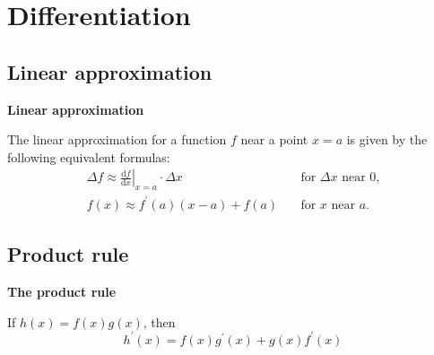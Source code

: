 \chapter{Differentiation}
\section{Linear approximation}
\textbf{Linear approximation}

The linear approximation for a function $f$ near a point $x=a$ is given by the following equivalent formulas:
\begin{align*}
    \Delta f\approx\left.\frac{\mathrm{d}f}{\mathrm{d}x}\right|_{x=a}\cdot\Delta x & \quad\text{for $\Delta x$ near $0$,} \\
        f(x)\approx f^\prime(a)(x-a)+f(a) & \quad\text{for $x$ near $a$.}
\end{align*}

\section{Product rule}
\textbf{The product rule}

If $h(x)=f(x)g(x)$, then
$$
h^\prime (x)=f(x)g^\prime (x)+g(x)f^\prime (x)
$$

